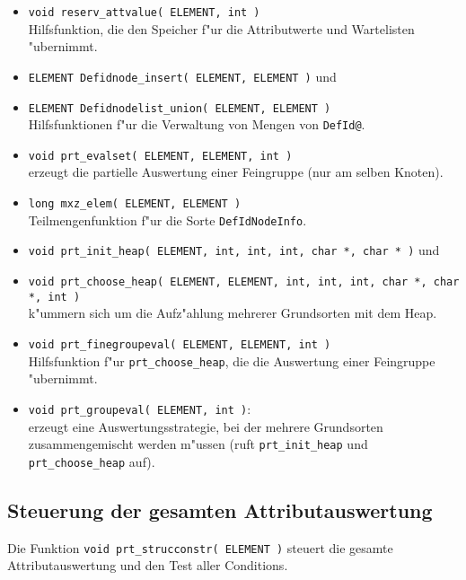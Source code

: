 \begin{itemize}
\item {\tt void reserv\_attvalue( ELEMENT, int )}\\
Hilfsfunktion, die den Speicher f"ur die Attributwerte und Wartelisten
"ubernimmt.

\item {\tt ELEMENT Defidnode\_insert( ELEMENT, ELEMENT )} und\\
\item {\tt ELEMENT Defidnodelist\_union( ELEMENT, ELEMENT )}\\
Hilfsfunktionen f"ur die Verwaltung von Mengen von {\tt DefId@}.

\item {\tt void prt\_evalset( ELEMENT, ELEMENT, int )}\\
erzeugt die partielle Auswertung einer Feingruppe (nur am selben Knoten).

\item {\tt long mxz\_elem( ELEMENT, ELEMENT )}\\
Teilmengenfunktion f"ur die Sorte {\tt DefIdNodeInfo}.

\item {\tt void prt\_init\_heap( ELEMENT, int, int, int, char *, char * )} und\\
\item {\tt void prt\_choose\_heap( ELEMENT, ELEMENT, int, int, int, char *, char *, int )}\\
k"ummern sich um die Aufz"ahlung mehrerer Grundsorten mit dem Heap.


\item {\tt void prt\_finegroupeval( ELEMENT, ELEMENT, int )}\\
Hilfsfunktion f"ur {\tt prt\_choose\_heap}, die die Auswertung einer Feingruppe
"ubernimmt.

\item {\tt void prt\_groupeval( ELEMENT, int )}:\\
erzeugt eine Auswertungsstrategie, bei der mehrere Grundsorten zusammengemischt
werden m"ussen (ruft {\tt prt\_init\_heap} und {\tt prt\_choose\_heap} auf).

\end{itemize}

\subsection{Steuerung der gesamten Attributauswertung}

Die Funktion {\tt void prt\_strucconstr( ELEMENT )}
steuert die gesamte Attributauswertung und den Test aller Conditions.

